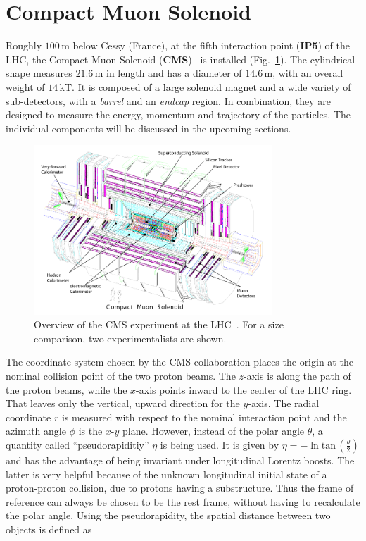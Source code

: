 \section{Compact Muon Solenoid}
\label{sec:cms}

Roughly $100\,\text{m}$ below Cessy (France), at the fifth interaction point (\textbf{IP5}) of the LHC, the Compact Muon Solenoid (\textbf{CMS})~\cite{cmsjinst} is installed (Fig.~\ref{fig:cms}). The cylindrical shape measures $21.6\,\text{m}$ in length and has a diameter of $14.6\,\text{m}$, with an overall weight of $14\,\text{kT}$. It is composed of a large solenoid magnet and a wide variety of sub-detectors, with a \textit{barrel} and an \textit{endcap} region. In combination, they are designed to measure the energy, momentum and trajectory of the particles. The individual components will be discussed in the upcoming sections.

\begin{figure}[ht!]
  \centering
  \includegraphics[width=0.8\textwidth]{plots/cms.pdf}
  \caption{Overview of the CMS experiment at the LHC~\cite{cmsjinst}. For a size comparison, two experimentalists are shown.}
  \label{fig:cms}
\end{figure}

The coordinate system chosen by the CMS collaboration places the origin at the nominal collision point of the two proton beams. The $z$-axis is along the path of the proton beams, while the $x$-axis points inward to the center of the LHC ring. That leaves only the vertical, upward direction for the $y$-axis. The radial coordinate $r$ is measured with respect to the nominal interaction point and the azimuth angle $\phi$ is the $x$-$y$ plane. However, instead of the polar angle $\theta$, a quantity called ``pseudorapiditiy'' $\eta$ is being used. It is given by $\eta = - \ln{\text{tan}\,\left(\frac{\theta}{2}\right)}$ and has the advantage of being invariant under longitudinal Lorentz boosts. The latter is very helpful because of the unknown longitudinal initial state of a proton-proton collision, due to protons having a substructure. Thus the frame of reference can always be chosen to be the rest frame, without having to recalculate the polar angle. Using the pseudorapidity, the spatial distance between two objects is defined as

